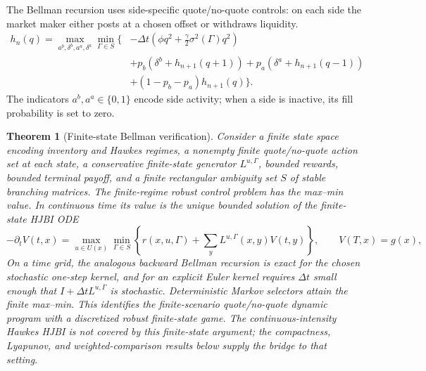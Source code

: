 \documentclass[11pt]{article}
\newtheorem{theorem}{Theorem}
\begin{document}
The Bellman recursion uses side-specific quote/no-quote controls: on each side
the market maker either posts at a chosen offset or withdraws liquidity.
\begin{align*}
h_n(q)=\max_{a^b,\delta^b,a^a,\delta^a}\min_{\Gamma\in S}\Big\{&
-\Delta t\left(\phi q^2+\frac{\gamma}{2}\sigma^2(\Gamma)q^2\right)\\
&+p_b(\delta^b+h_{n+1}(q+1))
+p_a(\delta^a+h_{n+1}(q-1))\\
&+(1-p_b-p_a)h_{n+1}(q)\Big\}.
\end{align*}
The indicators $a^b,a^a\in\{0,1\}$ encode side activity; when a side is
inactive, its fill probability is set to zero.

\begin{theorem}[Finite-state Bellman verification]
Consider a finite state space encoding inventory and Hawkes regimes, a nonempty
finite quote/no-quote action set at each state, a conservative finite-state
generator $L^{u,\Gamma}$, bounded rewards, bounded terminal payoff, and a
finite rectangular ambiguity set $S$ of stable branching matrices. The
finite-regime robust control problem has the max--min value. In continuous time
its value is the unique bounded solution of the finite-state HJBI ODE
\[
-\partial_t V(t,x)=
\max_{u\in U(x)}\min_{\Gamma\in S}
\left\{r(x,u,\Gamma)+\sum_y L^{u,\Gamma}(x,y)V(t,y)\right\},
\qquad V(T,x)=g(x),
\]
On a time grid, the analogous backward Bellman recursion is exact for the
chosen stochastic one-step kernel, and for an explicit Euler kernel requires
$\Delta t$ small enough that $I+\Delta t L^{u,\Gamma}$ is stochastic.
Deterministic Markov selectors attain the finite max--min. This identifies
the finite-scenario quote/no-quote dynamic program with a discretized robust
finite-state game. The continuous-intensity Hawkes HJBI is
not covered by this finite-state argument; the compactness, Lyapunov, and
weighted-comparison results below supply the bridge to that setting.
\end{theorem}
\end{document}
